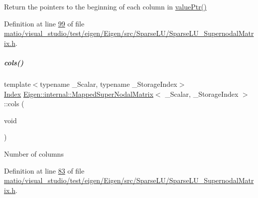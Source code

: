 Return the pointers to the beginning of each column in \hyperlink{group___sparse_l_u___module_a6e9ce7d448b76811802d11baf3da97d3}{value\+Ptr()} 

Definition at line \hyperlink{matio_2visual__studio_2test_2eigen_2_eigen_2src_2_sparse_l_u_2_sparse_l_u___supernodal_matrix_8h_source_l00099}{99} of file \hyperlink{matio_2visual__studio_2test_2eigen_2_eigen_2src_2_sparse_l_u_2_sparse_l_u___supernodal_matrix_8h_source}{matio/visual\+\_\+studio/test/eigen/\+Eigen/src/\+Sparse\+L\+U/\+Sparse\+L\+U\+\_\+\+Supernodal\+Matrix.\+h}.

\mbox{\label{group___sparse_l_u___module_a57b3811f03be2d94c0cdd105aba1b932}} 
\subparagraph{\texorpdfstring{cols()}{cols()}\hspace{0.1cm}{\footnotesize\ttfamily [1/2]}}
{\footnotesize\ttfamily template$<$typename \+\_\+\+Scalar, typename \+\_\+\+Storage\+Index$>$ \\
\hyperlink{namespace_eigen_a62e77e0933482dafde8fe197d9a2cfde}{Index} \hyperlink{group___sparse_l_u___module_class_eigen_1_1internal_1_1_mapped_super_nodal_matrix}{Eigen\+::internal\+::\+Mapped\+Super\+Nodal\+Matrix}$<$ \+\_\+\+Scalar, \+\_\+\+Storage\+Index $>$\+::cols (\begin{DoxyParamCaption}\item[{void}]{ }\end{DoxyParamCaption})\hspace{0.3cm}{\ttfamily [inline]}}

Number of columns 

Definition at line \hyperlink{matio_2visual__studio_2test_2eigen_2_eigen_2src_2_sparse_l_u_2_sparse_l_u___supernodal_matrix_8h_source_l00083}{83} of file \hyperlink{matio_2visual__studio_2test_2eigen_2_eigen_2src_2_sparse_l_u_2_sparse_l_u___supernodal_matrix_8h_source}{matio/visual\+\_\+studio/test/eigen/\+Eigen/src/\+Sparse\+L\+U/\+Sparse\+L\+U\+\_\+\+Supernodal\+Matrix.\+h}.


